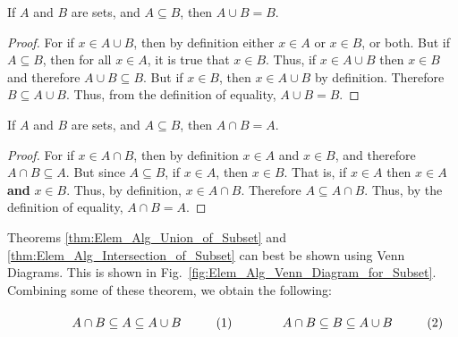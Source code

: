 \documentclass[crop=false,class=book,oneside]{standalone}
\begin{document}
            \begin{theorem}
                \label{thm:Elem_Alg_Union_of_Subset}
                If $A$ and $B$ are sets, and $A\subseteq{B}$,
                then $A\cup{B}=B$.
            \end{theorem}
            \begin{proof}
                For if $x\in{A\cup{B}}$, then by definition
                either $x\in{A}$ or $x\in{B}$, or both. But
                if $A\subseteq{B}$, then for all $x\in{A}$, it is
                true that $x\in{B}$. Thus, if $x\in{A}\cup{B}$
                then $x\in{B}$ and therefore
                $A\cup{B}\subseteq{B}$. But if $x\in{B}$, then
                $x\in{A}\cup{B}$ by definition. Therefore
                $B\subseteq{A}\cup{B}$. Thus, from the definition
                of equality, $A\cup{B}=B$.
            \end{proof}
            \begin{theorem}
                \label{thm:Elem_Alg_Intersection_of_Subset}
                If $A$ and $B$ are sets, and $A\subseteq{B}$,
                then $A\cap{B}=A$.
            \end{theorem}
            \begin{proof}
                For if $x\in{A}\cap{B}$, then by
                definition $x\in{A}$ and $x\in{B}$,
                and therefore ${A}\cap{B}\subseteq{A}$.
                But since $A\subseteq{B}$, if
                $x\in{A}$, then $x\in{B}$. That is, if
                $x\in{A}$ then $x\in{A}$ \textbf{and} $x\in{B}$.
                Thus, by definition, $x\in{A}\cap{B}$.
                Therefore $A\subseteq{A}\cap{B}$. Thus, by
                the definition of equality,
                $A\cap{B}=A$.
            \end{proof}
            Theorems \ref{thm:Elem_Alg_Union_of_Subset} and
            \ref{thm:Elem_Alg_Intersection_of_Subset} can best
            be shown using Venn Diagrams. This is shown
            in Fig.~\ref{fig:Elem_Alg_Venn_Diagram_for_Subset}.
            Combining some of these theorem, we obtain the
            following:
            \par
            \vspace{1ex}
            \begin{subequations}
                \begin{minipage}{0.49\textwidth}
                    \begin{equation}
                        A\cap{B}\subseteq{A}\subseteq{A}\cup{B}
                    \end{equation}
                \end{minipage}
                \hfill
                \begin{minipage}{0.49\textwidth}
                    \begin{equation}
                        A\cap{B}\subseteq{B}\subseteq{A}\cup{B}
                    \end{equation}
                \end{minipage}
            \end{subequations}
\end{document}

